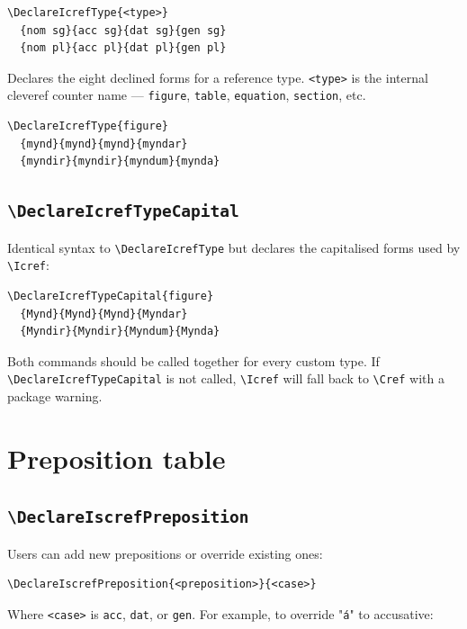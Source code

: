 \documentclass{article}
\begin{document}
\begin{lstlisting}
\DeclareIcrefType{<type>}
  {nom sg}{acc sg}{dat sg}{gen sg}
  {nom pl}{acc pl}{dat pl}{gen pl}
\end{lstlisting}

Declares the eight declined forms for a reference type. \texttt{<type>}
is the internal cleveref counter name --- \texttt{figure},
\texttt{table}, \texttt{equation}, \texttt{section}, etc.

\begin{lstlisting}
\DeclareIcrefType{figure}
  {mynd}{mynd}{mynd}{myndar}
  {myndir}{myndir}{myndum}{mynda}
\end{lstlisting}

\subsection{\texttt{\textbackslash DeclareIcrefTypeCapital}}

Identical syntax to \verb|\DeclareIcrefType| but declares the
capitalised forms used by \verb|\Icref|:

\begin{lstlisting}
\DeclareIcrefTypeCapital{figure}
  {Mynd}{Mynd}{Mynd}{Myndar}
  {Myndir}{Myndir}{Myndum}{Mynda}
\end{lstlisting}

Both commands should be called together for every custom type. If
\verb|\DeclareIcrefTypeCapital| is not called, \verb|\Icref| will fall
back to \verb|\Cref| with a package warning.

\section{Preposition table}

\subsection{\texttt{\textbackslash DeclareIscrefPreposition}}

Users can add new prepositions or override existing ones:

\begin{lstlisting}
\DeclareIscrefPreposition{<preposition>}{<case>}
\end{lstlisting}

Where \texttt{<case>} is \texttt{acc}, \texttt{dat}, or \texttt{gen}.
For example, to override "\texttt{á}" to accusative:
\end{document}
